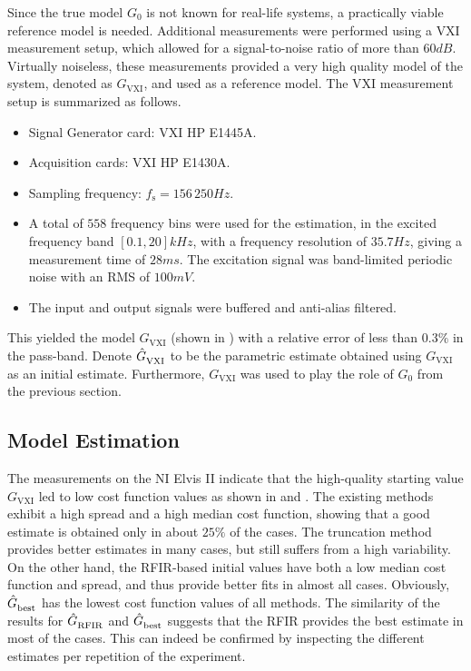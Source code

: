 Since the true model $G_0$ is not known for real-life systems, a practically viable reference model is needed.
Additional measurements were performed using a \gls{VXI} measurement setup, which allowed for a signal-to-noise ratio of more than $60\unit{dB}$. 
Virtually noiseless, these measurements provided a very high quality model of the system, denoted as $G_\mathrm{VXI}$, and used as a reference model. 
The \gls{VXI} measurement setup is summarized as follows.
\begin{itemize}
  \item Signal Generator card: \gls{VXI} HP E1445A.
  \item Acquisition cards: \gls{VXI} HP E1430A.
  \item Sampling frequency: $f_\mathrm{s} = 156\,250 \unit{Hz}$.
  \item A total of $558$ frequency bins were used for the estimation, in the excited frequency band $[0.1,20] \unit{kHz}$, with a frequency resolution of $35.7\unit{Hz}$, giving a measurement time of $28\unit{ms}$. The excitation signal was band-limited periodic noise with an \gls{RMS} of $100\unit{mV}$.
  \item The input and output signals were buffered and anti-alias filtered.
\end{itemize}
This yielded the model $G_\mathrm{VXI}$ (shown in ) with a relative error  of less than $0.3\%$ in the pass-band.  Denote $\hat{G}_{\mathrm{VXI}}^{\mathrm{}}$ to be the parametric estimate obtained using $G_{\mathrm{VXI}}$ as an initial estimate. Furthermore, $G_\mathrm{VXI}$ was used to play the role of $G_0$ from the previous section.

\subsection{Model Estimation}
  The measurements on the NI Elvis II indicate that the high-quality starting value $G_{\mathrm{VXI}}$ led to low cost function values as shown in  and .
  The existing methods exhibit a high spread and a high median cost function, showing that a good estimate is obtained only in about $25\%$ of the cases.
  The truncation method provides better estimates in many cases, but still suffers from a high variability.
  On the other hand, the \gls{RFIR}-based initial values have both a low median cost function and spread, and thus provide better fits in almost all cases.
  Obviously, $\hat{G}_{\mathrm{best}}^{\mathrm{}}$ has the lowest cost function values of all methods.
  The similarity of the results for $\hat{G}_{\mathrm{RFIR}}^{\mathrm{}}$ and $\hat{G}_{\mathrm{best}}^{\mathrm{}}$ suggests that the \gls{RFIR} provides the best estimate in most of the cases.
  This can indeed be confirmed by inspecting the different estimates per repetition of the experiment.

